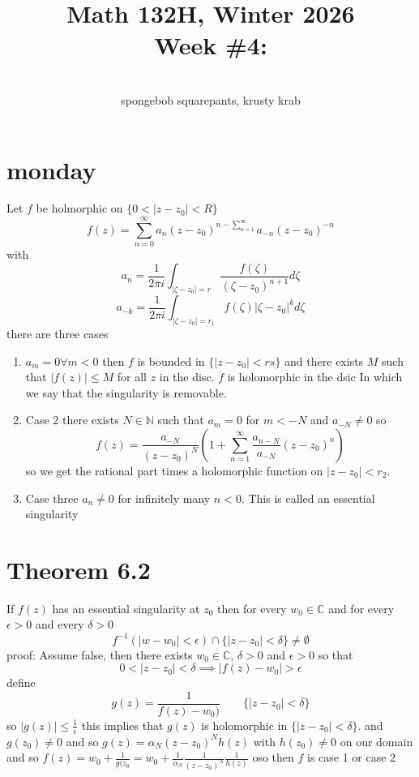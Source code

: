 \documentclass[11pt]{article}
\newcommand{\cnum}{Math 132H}
\newcommand{\ced}{Winter 2026}
\newcommand{\ctitle}[4]{\title{\vspace{-0.5in}\cnum, \ced\\Week #1: #2}\author{\vspace{-0.35in}\\#3, #4}}
\begin{document}
\ctitle{\#4}{}{spongebob squarepants}{krusty krab}
\date{}
\maketitle

\section{monday}
Let $f$ be holmorphic on $\{0 < |z-z_0| < R\}$
\[
    f(z) = \sum_{n=0}^{\infty}a_n (z-z_0)^{n - \sum_{n=1}^{\infty}}a_{-n}(z-z_0)^{-n}
\] 
with
\[
a_n = \frac{1}{2\pi i} \int_{|\zeta - z_0| = r}^{} \frac{f(\zeta)}{(\zeta - z_0)^{n+1}}d \zeta
\] 
\[
    a_{-k} = \frac{1}{2\pi i} \int_{|\zeta - z_0| = r_1}^{} f(\zeta) |\zeta-z_0|^{k} d\zeta
\] 
there are three cases
\begin{enumerate}
    \item $a_m = 0 \forall m < 0$ then  $f$ is bounded in $\{|z-z_0| < rs\}$ and there exists $M$ such that
        $|f(z)| \le M$ for all  $z$ in the disc.
        $f$ is holomorphic in the dsic
        In which we say that the singularity is removable.
    \item Case 2 there exists $N \in \mathbb{N}$ such that $a_m = 0$  for  $m < -N$ and  $a_{-N} \ne 0$
        so
         \[
             f(z) = \frac{a_{-N}}{(z-z_0)^{N}} (1 + \sum_{n=1}^{\infty} \frac{a_{n-N}}{a_{-N}}(z-z_0)^{n})
        \] 
        so we get the rational part times a holomorphic function on $|z-z_0| < r_2$.
    \item Case three $a_n \ne 0 $ for infinitely many  $n < 0$. This is called an essential singularity
\end{enumerate}
\section{Theorem 6.2} If $f(z)$ has an essential singularity at $z_0$ then for every $w_0 \in \mathbb{C}$ and for every $\epsilon > 0$ and every $\delta > 0$
\[
    f^{-1}(|w-w_0| < \epsilon) \cap \{|z-z_0| < \delta\} \ne \emptyset
\] 
proof: Assume false, then there exists $w_0 \in \mathbb{C}$, $\delta > 0$ and $\epsilon > 0$ so that
\[
0 < |z-z_0| <  \delta \implies |f(z) - w_0| >  \epsilon
\] 
define
\[
    g(z) = \frac{1}{f(z) - w_0)}\qquad \{|z-z_0| < \delta\} 
\] 
so $|g(z)| \le \frac{1}{\epsilon}$ this implies that $g(z)$ is holomorphic in  $\{|z-z_0| < \delta\}$. and $g(z_0) \ne 0$
and so $g(z) = \alpha_N(z-z_0)^{N}h(z)$ with $h(z_0) \ne 0$ on our domain
and so $f(z) = w_0 + \frac{1}{g(z_0} = w_0 + \frac{1}{\alpha_N}\frac{1}{(z-z_0)^{N}} \frac{1}{h(z)}$ oso then $f$ is case 1 or case 2
\end{document}
